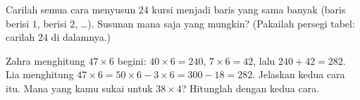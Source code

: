 \begin{exercise}[$\star\star$]\label{exo:g3:mult:11}
Carilah semua cara menyusun $24$ kursi menjadi baris yang sama
banyak (baris berisi $1$, berisi $2$, \dots). Susunan mana saja yang
mungkin? (Pakailah persegi tabel: carilah $24$ di dalamnya.)
\end{exercise}

\begin{exercise}[$\star\star$]\label{exo:g3:mult:12}
Zahra menghitung $47 \times 6$ begini: $40 \times 6 = 240$,
$7 \times 6 = 42$, lalu $240 + 42 = 282$. Lia menghitung
$47 \times 6 = 50 \times 6 - 3 \times 6 = 300 - 18 = 282$. Jelaskan
kedua cara itu. Mana yang kamu sukai untuk $38 \times 4$? Hitunglah
dengan kedua cara.

\end{exercise}

